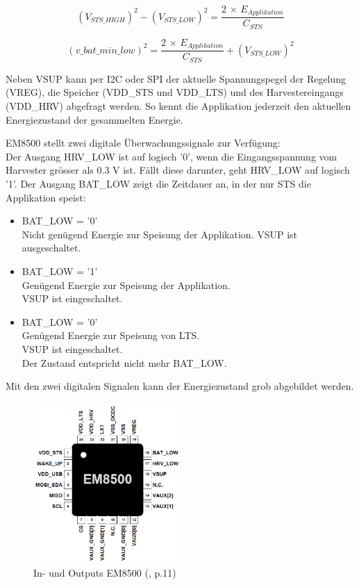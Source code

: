 \begin{equation}
(V_{STS\_HIGH}) ^2 - (V_{STS\_LOW})^2 =  \frac{2\, \times \, E_{Applikation}}{C_{STS}}
\end{equation}


\begin{equation}
(v\_bat\_min\_low) ^2  =  \frac{2\, \times \, E_{Applikation}}{C_{STS}} + (V_{STS\_LOW})^2
\end{equation}


Neben VSUP kann per I2C oder SPI der aktuelle Spannungspegel der Regelung (VREG), die Speicher (VDD\_STS und VDD\_LTS) und des Harvestereingangs (VDD\_HRV) abgefragt werden. So kennt die Applikation jederzeit den aktuellen Energiezustand der gesammelten Energie.

EM8500 stellt zwei digitale Überwachungssignale zur Verfügung:\\ 
Der Ausgang HRV\_LOW ist auf logisch '0', wenn die Eingangsspannung vom Harvester grösser als 0.3 V ist. Fällt diese darunter, geht HRV\_LOW auf logisch '1'.
Der Ausgang BAT\_LOW zeigt die Zeitdauer an, in der nur STS die Applikation speist:

\begin{itemize}
     \item BAT\_LOW = '0'\\
           Nicht genügend Energie zur Speisung der Applikation.
           VSUP ist ausgeschaltet.
     \item BAT\_LOW = '1'\\
           Genügend Energie zur Speisung der Applikation.\\
           VSUP ist eingeschaltet.
      \item BAT\_LOW = '0'\\
           Genügend Energie zur Speisung von LTS.\\
           VSUP ist eingeschaltet.\\
           Der Zustand entspricht nicht mehr BAT\_LOW.   
\end{itemize} 

Mit den zwei digitalen Signalen kann der Energiezustand grob abgebildet werden.

\begin{figure}[ht]
    \includegraphics[width=0.5\textwidth]{2TheoretischeGrundlagen/imag/EM8500IO.png}
    \caption{In- und Outputs EM8500  (\cite{datasheet_EM85}, p.11)}
    \label{IOEM8500} 
\end{figure}



